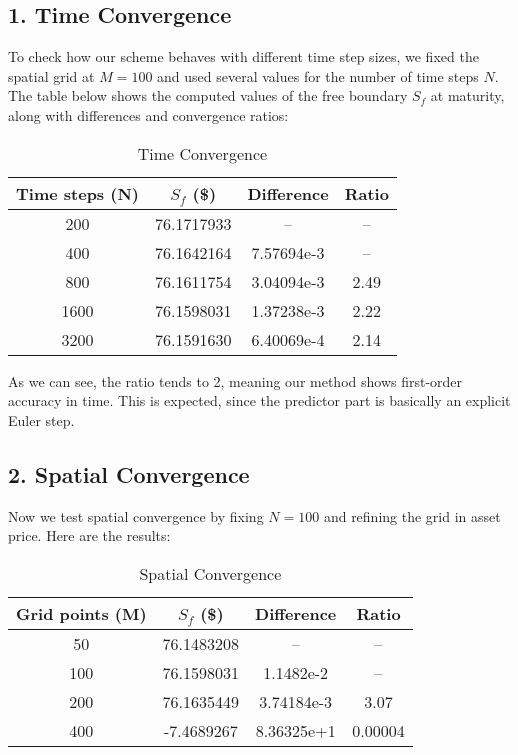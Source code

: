 \documentclass{article}
\begin{document}
\subsection*{1. Time Convergence}

To check how our scheme behaves with different time step sizes, we fixed the spatial grid at $M = 100$ and used several values for the number of time steps $N$. The table below shows the computed values of the free boundary $S_f$ at maturity, along with differences and convergence ratios:

\begin{table}[h!]
\centering
\caption{Time Convergence}
\begin{tabular}{cccc}
\toprule
\textbf{Time steps (N)} & \textbf{$S_f$ (\$)} & \textbf{Difference} & \textbf{Ratio} \\
\midrule
200  & 76.1717933 & --             & --     \\
400  & 76.1642164 & 7.57694e-3     & --     \\
800  & 76.1611754 & 3.04094e-3     & 2.49   \\
1600 & 76.1598031 & 1.37238e-3     & 2.22   \\
3200 & 76.1591630 & 6.40069e-4     & 2.14   \\
\bottomrule
\end{tabular}
\end{table}

\noindent As we can see, the ratio tends to 2, meaning our method shows first-order accuracy in time. This is expected, since the predictor part is basically an explicit Euler step.

\subsection*{2. Spatial Convergence}

Now we test spatial convergence by fixing $N = 100$ and refining the grid in asset price. Here are the results:

\begin{table}[h!]
\centering
\caption{Spatial Convergence}
\begin{tabular}{cccc}
\toprule
\textbf{Grid points (M)} & \textbf{$S_f$ (\$)} & \textbf{Difference} & \textbf{Ratio} \\
\midrule
50   & 76.1483208 & --           & --       \\
100  & 76.1598031 & 1.1482e-2    & --       \\
200  & 76.1635449 & 3.74184e-3   & 3.07     \\
400  & -7.4689267 & 8.36325e+1   & 0.00004  \\
\bottomrule
\end{tabular}
\end{table}
\end{document}
